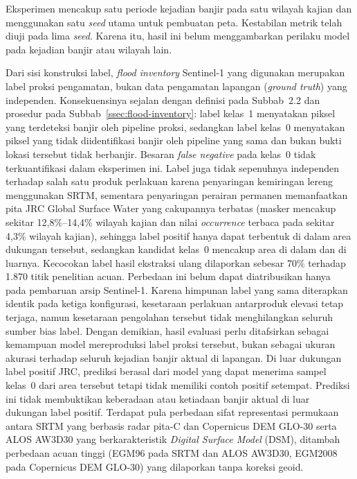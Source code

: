 \documentclass[12pt,a4paper]{article}
\begin{document}
Eksperimen mencakup satu periode kejadian banjir pada satu wilayah kajian dan
menggunakan satu \textit{seed} utama untuk pembuatan peta. Kestabilan metrik
telah diuji pada lima \textit{seed}. Karena itu, hasil ini belum menggambarkan
perilaku model pada kejadian banjir atau wilayah lain.

Dari sisi konstruksi label, \textit{flood inventory} Sentinel-1 yang digunakan
merupakan label proksi pengamatan, bukan data pengamatan lapangan
(\textit{ground truth}) yang independen. Konsekuensinya sejalan dengan
definisi pada Subbab~2.2 dan prosedur pada
Subbab~\ref{ssec:flood-inventory}: label kelas~1 menyatakan piksel yang terdeteksi
banjir oleh pipeline proksi, sedangkan label kelas~0 menyatakan piksel yang
tidak diidentifikasi banjir oleh pipeline yang sama dan bukan bukti lokasi
tersebut tidak berbanjir. Besaran \textit{false negative} pada kelas~0 tidak
terkuantifikasi dalam eksperimen ini. Label juga tidak sepenuhnya
independen terhadap salah satu produk perlakuan karena penyaringan kemiringan
lereng menggunakan SRTM, sementara penyaringan perairan permanen memanfaatkan
pita JRC Global Surface Water yang cakupannya terbatas (masker mencakup
sekitar 12,8\%--14,4\% wilayah kajian dan nilai \textit{occurrence} terbaca
pada sekitar 4,3\% wilayah kajian), sehingga label positif hanya dapat
terbentuk di dalam area dukungan tersebut, sedangkan kandidat kelas~0
mencakup area di dalam dan di luarnya. Kecocokan label hasil ekstraksi
ulang dilaporkan sebesar 70\% terhadap 1.870 titik penelitian acuan.
Perbedaan ini belum dapat diatribusikan hanya pada pembaruan arsip
Sentinel-1. Karena himpunan label yang sama diterapkan identik
pada ketiga konfigurasi, kesetaraan perlakuan antarproduk elevasi tetap
terjaga, namun kesetaraan pengolahan tersebut tidak menghilangkan seluruh
sumber bias label. Dengan demikian, hasil evaluasi perlu ditafsirkan sebagai
kemampuan model mereproduksi label proksi tersebut, bukan sebagai ukuran
akurasi terhadap seluruh kejadian banjir aktual di lapangan. Di luar
dukungan label positif JRC, prediksi berasal dari model yang dapat menerima
sampel kelas~0 dari area tersebut tetapi tidak memiliki contoh positif
setempat. Prediksi ini tidak membuktikan keberadaan atau ketiadaan banjir
aktual di luar dukungan label positif.
Terdapat pula perbedaan sifat representasi permukaan antara SRTM yang
berbasis radar pita-C dan Copernicus DEM GLO-30 serta ALOS AW3D30 yang
berkarakteristik \textit{Digital Surface Model} (DSM), ditambah perbedaan
acuan tinggi (EGM96 pada SRTM dan ALOS AW3D30, EGM2008 pada Copernicus
DEM GLO-30) yang dilaporkan tanpa koreksi geoid.
\end{document}
